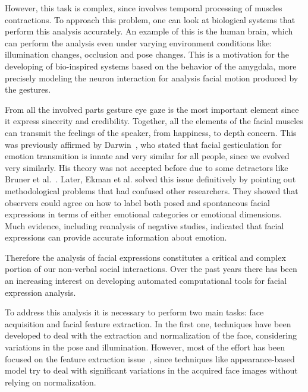 However, this task is complex, since involves temporal processing of muscles contractions. To approach this problem, one can look at biological systems that perform this analysis accurately. An example of this is the human brain, which can perform the analysis even under varying environment conditions like: illumination changes, occlusion and pose changes. This is a motivation for the developing of bio-inspired systems based on the behavior of the amygdala, more precisely modeling the neuron interaction for analysis facial motion produced by the gestures.

From all the involved parts gesture eye gaze is the most important element since it express sincerity and credibility. Together, all the elements of the facial muscles can transmit the feelings of the speaker, from happiness, to depth concern. This was previously affirmed by Darwin~\cite{Darwin1872}, who stated that facial gesticulation for emotion transmition is innate and very similar for all people, since we evolved very similarly. His theory was not accepted before due to some detractors like Bruner et al.~\cite{Bruner1954}. Later, Ekman et al. \cite{Hager1979} solved this issue definitively by pointing out methodological problems that had confused other researchers. They showed that observers could agree on how to label both posed and spontaneous facial expressions in terms of either emotional categories or emotional dimensions. Much evidence, including reanalysis of negative studies, indicated that facial expressions can provide accurate information about emotion.

Therefore the analysis of facial expressions constitutes a critical and complex portion of our non-verbal social interactions. Over the past years there has been an increasing interest on developing automated computational tools for facial expression analysis.

To address this analysis it is necessary to perform two main tasks: face acquisition and facial feature extraction. In the first one, techniques have been developed to deal with the extraction and normalization of the face, considering variations in the pose and illumination. However, most of the effort has been focused on the feature extraction issue~\cite{Fasel1999}, since techniques like appearance-based model try to deal with significant variations in the acquired face images without relying on normalization.

